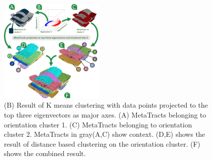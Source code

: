 \begin{figure}[tb] 
  \centering  	
 \includegraphics[width=0.45\textwidth]{imagesMT2014/image_clustering.pdf}
  	\caption{(B) Result of K means clustering with data points projected to the top three eigenvectors as major axes. (A) MetaTracts belonging to orientation cluster 1. (C) MetaTracts belonging to orientation cluster 2. MetaTracts in gray(A,C) show context.
  	(D,E) shows the result of distance based clustering on the orientation cluster. (F) shows the combined result. }
  \label{fig:orientation_clustering}
  \end{figure}

